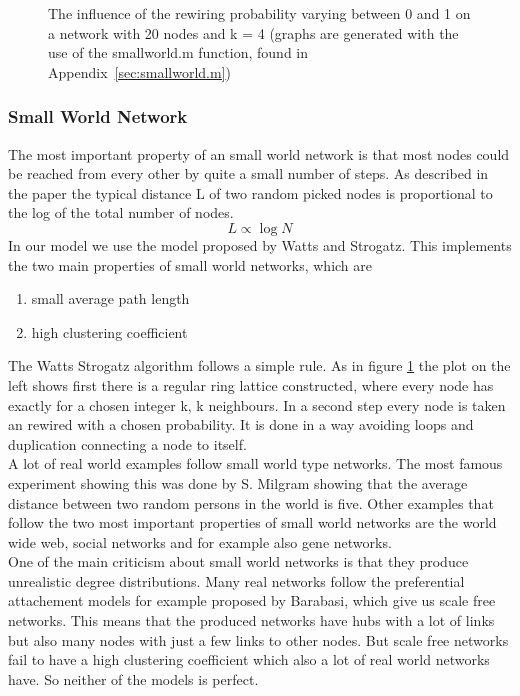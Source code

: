 \begin{figure}[!t]
\caption{The influence of the rewiring probability varying between 0 and 1 on a
  network with 20 nodes and k = 4 (graphs are generated with the use of the
  smallworld.m function, found in Appendix~\ref{sec:smallworld.m})}
\label{influencerewiringprob}
\end{figure}


\subsubsection{Small World Network}
\label{sec:smallworld}
The most important property of an small world network is that most nodes could be reached from every other by quite a small number of steps. As described in the paper \cite{watts98} the typical distance L of two random picked nodes is proportional to the log of the total number of nodes.
\begin{equation}
L \propto \log N
\end{equation}
In our model we use the model proposed by Watts and Strogatz. This implements the two main properties of small world networks, which are
\begin{enumerate}
\item small average path length
\item high clustering coefficient
\end{enumerate}
The Watts Strogatz algorithm follows a simple rule. As in figure \ref{influencerewiringprob} the plot on the left shows first there is a regular ring lattice constructed, where every node has exactly for a chosen integer k, k neighbours. In a second step every node is taken an rewired with a chosen probability. It is done in a way avoiding loops and duplication \ie connecting a node to itself.\\
A lot of real world examples follow small world type networks. The most famous experiment showing this was done by S. Milgram showing that the average distance between two random persons in the world is five. Other examples that follow the two most important properties of small world networks are the world wide web, social networks and for example also gene networks. \\
One of the main criticism about small world networks is that they produce unrealistic degree distributions. Many real networks follow the preferential attachement models for example proposed by Barabasi, which give us scale free networks. This means that the produced networks have hubs with a lot of links but also many nodes with just a few links to other nodes. But scale free networks fail to have a high clustering coefficient which also a lot of real world networks have. So neither of the models is perfect.

